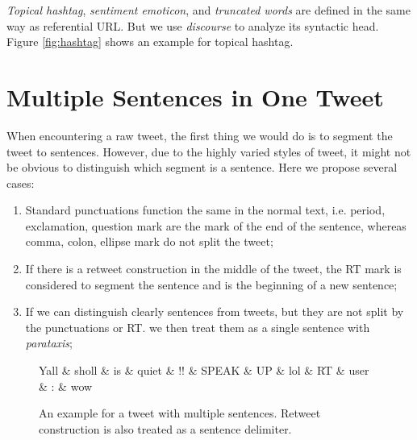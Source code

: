 \documentclass[11pt,a4paper]{article}
\begin{document}
\textit{Topical hashtag}, \textit{sentiment emoticon}, and \textit{truncated words}
are defined in the same way as referential URL.
But we use \textit{discourse} to analyze its syntactic head.
Figure \ref{fig:hashtag} shows an example for topical hashtag.

\section{Multiple Sentences in One Tweet}\label{sec:sent-seg}
When encountering a raw tweet, 
the first thing we would do is to segment the tweet to sentences.
However, due to the highly varied styles of tweet, 
it might not be obvious to distinguish which segment is a sentence.
Here we propose several cases:
\begin{enumerate}
	\item Standard punctuations function the same in the normal text,
	i.e. period, exclamation, question mark are the mark of the end of the sentence,
	whereas comma, colon, ellipse mark do not split the tweet;
	\item If there is a retweet construction in the middle of the tweet,
	the RT mark is considered to segment the sentence and is the beginning of a new sentence;
	\item If we can distinguish clearly sentences from tweets, 
	but they are not split by the punctuations or RT. 
	we then treat them as a single sentence with \textit{parataxis};
\end{enumerate}

\begin{figure}[t]
	\centering
	\small
	\begin{dependency}[edge slant=2, text only label, label style=above]
		\begin{deptext}
			Yall \& sholl \& is \& quiet \& !! \& SPEAK \& UP \& lol \& RT \& user \& : \& wow \\
		\end{deptext}
	\end{dependency}
	\caption{An example for a tweet with multiple sentences. 
		Retweet  construction is also treated as a sentence delimiter.}\label{fig:multi-seg}
\end{figure}
\end{document}
